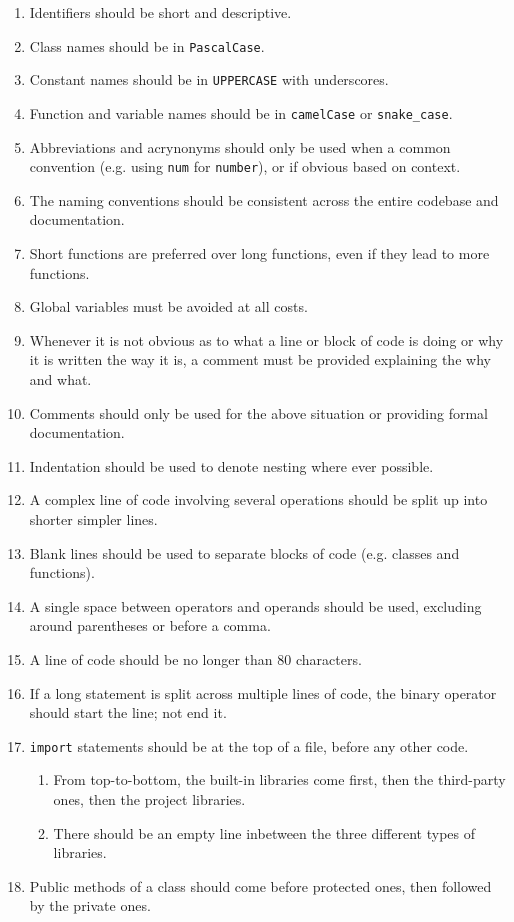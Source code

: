 \documentclass[11pt]{article}
\begin{document}
\begin{enumerate}
    \item Identifiers should be short and descriptive.
    \item Class names should be in \texttt{PascalCase}.
    \item Constant names should be in \texttt{UPPERCASE} with underscores.
    \item Function and variable names should be in \texttt{camelCase} or \texttt{snake\_case}.
    \item Abbreviations and acrynonyms should only be used when a common convention (e.g. using \texttt{num} for \texttt{number}), or if obvious based on context.
    \item The naming conventions should be consistent across the entire codebase and documentation.
    \item Short functions are preferred over long functions, even if they lead to more functions.
    \item Global variables must be avoided at all costs.
    \item Whenever it is not obvious as to what a line or block of code is doing or why it is written the way it is, a comment must be provided explaining the why and what.
    \item Comments should only be used for the above situation or providing formal documentation.
    \item Indentation should be used to denote nesting where ever possible.
    \item A complex line of code involving several operations should be split up into shorter simpler lines.
    \item Blank lines should be used to separate blocks of code (e.g. classes and functions).
    \item A single space between operators and operands should be used, excluding around parentheses or before a comma.
    \item A line of code should be no longer than 80 characters.
    \item If a long statement is split across multiple lines of code, the binary operator should start the line; not end it.
    \item \texttt{import} statements should be at the top of a file, before any other code.
    \begin{enumerate}
        \item From top-to-bottom, the built-in libraries come first, then the third-party ones, then the project libraries.
        \item There should be an empty line inbetween the three different types of libraries.
    \end{enumerate}
    \item Public methods of a \gls{class} should come before protected ones, then followed by the private ones.
\end{enumerate}
\end{document}
